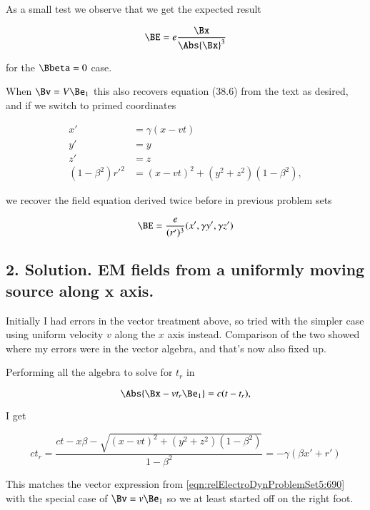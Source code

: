 As a small test we observe that we get the expected result

\begin{equation}\label{eqn:relElectroDynProblemSet5:820}
\BE = e \frac{\Bx}{\Abs{\Bx}^3}
\end{equation}

for the $\Bbeta = 0$ case.

When $\Bv = V \Be_1$ this also recovers equation (38.6) from the text as desired, and if we switch to primed coordinates

\begin{align}\label{eqn:relElectroDynProblemSet5:840}
x' &= \gamma( x - v t) \\
y' &= y \\
z' &= z \\
(1 - \beta^2) {r'}^2 &= (x - v t)^2 + (y^2 + z^2)(1 - \beta^2),
\end{align}

we recover the field equation derived twice before in previous problem sets

\begin{equation}\label{eqn:relElectroDynProblemSet5:1000}
\BE = \frac{e}{(r')^3} ( x', \gamma y', \gamma z')
\end{equation}

\subsection{2. Solution.  EM fields from a uniformly moving source along x axis.}

Initially I had errors in the vector treatment above, so tried with the simpler case using uniform velocity $v$ along the $x$ axis instead.  Comparison of the two showed where my errors were in the vector algebra, and that's now also fixed up.

Performing all the algebra to solve for $t_r$ in 

\begin{equation}\label{eqn:relElectroDynProblemSet5:860}
\Abs{\Bx - v t_r \Be_1} = c(t - t_r),
\end{equation}

I get

\begin{equation}\label{eqn:relElectroDynProblemSet5:880}
c t_r = \frac{c t - x \beta - \sqrt{ (x- v t)^2 + (y^2 + z^2)(1-\beta^2) } }{ 1 - \beta^2 } = - \gamma (\beta x' + r' )
\end{equation}

This matches the vector expression from \ref{eqn:relElectroDynProblemSet5:690} with the special case of $\Bv = v \Be_1$ so we at least started off on the right foot.

